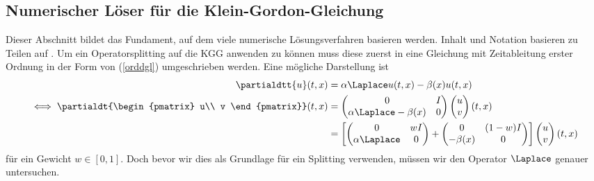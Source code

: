 \subsection{Numerischer Löser für die Klein-Gordon-Gleichung}
\label{chapter:solver_kgg}
Dieser Abschnitt bildet das Fundament, auf dem viele numerische Lösungsverfahren basieren werden. Inhalt und Notation basieren zu Teilen auf \autocite{patrickdiplom}. Um ein Operatorsplitting auf die KGG anwenden zu können muss diese zuerst in eine Gleichung mit Zeitableitung erster Ordnung in der Form von (\ref{orddgl}) umgeschrieben werden. Eine mögliche Darstellung ist
\begin{align}
\partialdtt{u}(t,x)&=\alpha \Laplace u(t,x) - \beta(x)u(t,x)\nonumber\\
\iff
\partialdt{\begin{pmatrix}
u\\
v
\end{pmatrix}}(t,x)&=
\begin{pmatrix}
0 & I\\
\alpha \Laplace - \beta(x) & 0
\end{pmatrix}
\begin{pmatrix}u\\v\end{pmatrix}(t,x)\nonumber\\
\label{eqn:formalsplit_kgg}
&=\left[\begin{pmatrix} 0 & wI\\ \alpha \Laplace & 0\end{pmatrix} 
+ \begin{pmatrix} 0 & (1-w)I\\ -\beta(x) & 0\end{pmatrix}\right]
\begin{pmatrix}u\\v\end{pmatrix}(t,x)
\end{align}
für ein Gewicht $w\in [0,1]$. Doch bevor wir dies als Grundlage für ein Splitting verwenden, müssen wir den Operator $\Laplace$ genauer untersuchen.
